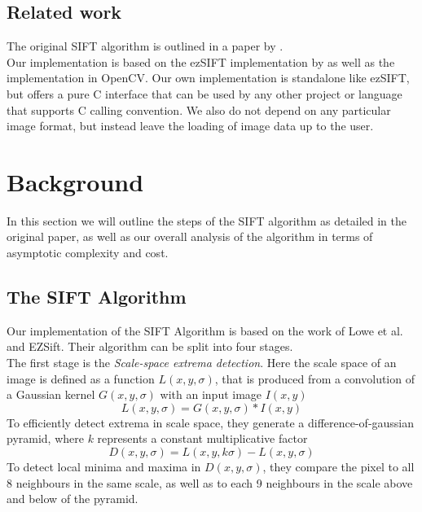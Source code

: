 \documentclass[letterpaper]{article}
\begin{document}
\subsection*{Related work}
The original SIFT algorithm is outlined in a paper by \citet{lowe2004distinctive}\cite{lowe1999object}. \\

Our implementation is based on the ezSIFT implementation by \citet{ezsift} as well as the implementation in OpenCV\cite{opencv}. Our own implementation is standalone like ezSIFT, but offers a pure C interface that can be used by any other project or language that supports C calling convention. We also do not depend on any particular image format, but instead leave the loading of image data up to the user.

\section{Background}\label{sec:background}
In this section we will outline the steps of the SIFT algorithm as detailed in the original paper\cite{lowe2004distinctive}, as well as our overall analysis of the algorithm in terms of asymptotic complexity and cost.

\subsection*{The SIFT Algorithm}
Our implementation of the SIFT Algorithm is based on the work of Lowe et al.\cite{lowe2004distinctive} and EZSift\cite{ezsift}. Their algorithm can be split into four stages.\\
The first stage is the \emph{Scale-space extrema detection}. Here the scale space of an image is defined as a function $L(x,y,\sigma)$, that is produced from a convolution of a Gaussian kernel $G(x,y,\sigma)$ with an input image $I(x,y)$
\begin{equation}
    L(x,y,\sigma)=G(x,y,\sigma) * I(x,y)
\end{equation}
To efficiently detect extrema in scale space, they generate a difference-of-gaussian pyramid, where $k$ represents a constant multiplicative factor
\begin{equation}
    D(x,y,\sigma) = L(x,y,k\sigma) - L(x,y,\sigma)
\end{equation}
To detect local minima and maxima in $D(x,y,\sigma)$, they compare the pixel to all 8 neighbours in the same scale, as well as to each 9 neighbours in the scale above and below of the pyramid.\\
\end{document}
